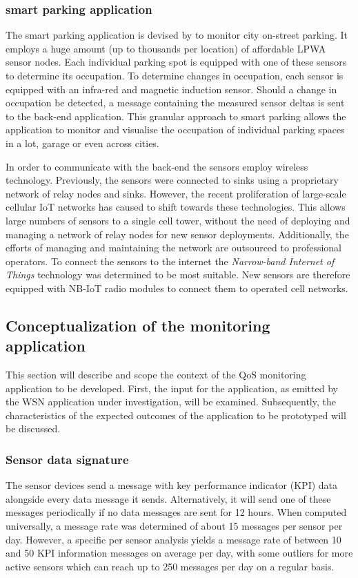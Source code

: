 \subsubsection*{\sensit smart parking application}
The \sensit\cite{web:sensit} smart parking application is devised by \nedapidsystems to monitor city on-street parking. It employs a huge amount (up to thousands per location) of affordable LPWA sensor nodes. Each individual parking spot is equipped with one of these sensors to determine its occupation. To determine changes in occupation, each sensor is equipped with an infra-red and magnetic induction sensor. Should a change in occupation be detected, a message containing the measured sensor deltas is sent to the back-end application. This granular approach to smart parking allows the \sensit application to monitor and visualise the occupation of individual parking spaces in a lot, garage or even across cities.

In order to communicate with the back-end the sensors employ wireless technology. Previously, the sensors were connected to sinks using a proprietary network of relay nodes and sinks. However, the recent proliferation of large-scale cellular IoT networks has caused \nedap to shift towards these technologies. This allows large numbers of sensors to a single cell tower, without the need of deploying and managing a network of relay nodes for new sensor deployments. Additionally, the efforts of managing and maintaining the network are outsourced to professional operators. To connect the sensors to the internet the \emph{Narrow-band Internet of Things} technology was determined to be most suitable. New \sensit sensors are therefore equipped with \ublox\cite{web:ublox} NB-IoT radio modules to connect them to operated cell networks.

\subsection{Conceptualization of the monitoring application}
This section will describe and scope the context of the QoS monitoring application to be developed. First, the input for the application, as emitted by the WSN application under investigation, will be examined. Subsequently, the characteristics of the expected outcomes of the application to be prototyped will be discussed.

\subsubsection{Sensor data signature}
The sensor devices send a message with key performance indicator (KPI) data alongside every data message it sends. Alternatively, it will send one of these messages periodically if no data messages are sent for 12 hours. When computed universally, a message rate was determined of about 15 messages per sensor per day. However, a specific per sensor analysis yields a message rate of between 10 and 50 KPI information messages on average per day, with some outliers for more active sensors which can reach up to 250 messages per day on a regular basis.

